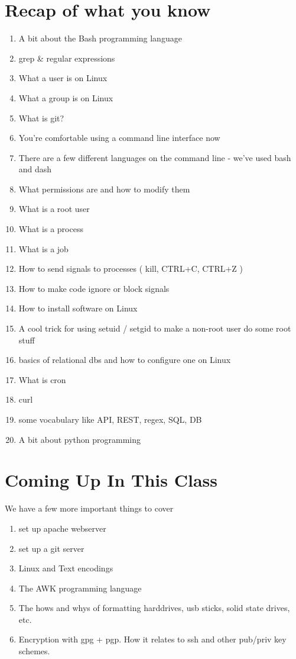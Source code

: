 \documentclass[12pt]{article}
\begin{document}
\section{Recap of what you know}
\begin{enumerate}
\item A bit about the Bash programming language
\item grep \& regular expressions
\item What a user is on Linux
\item What a group is on Linux
\item What is git?
\item You're comfortable using a command line interface now
\item There are a few different languages on the command line - we've used bash and dash
\item What permissions are and how to modify them
\item What is a root user
\item What is a process
\item What is a job
\item How to send signals to processes ( kill, CTRL+C, CTRL+Z )
\item How to make code ignore or block signals
\item How to install software on Linux
\item A cool trick for using setuid / setgid to make a non-root user do some root stuff
\item basics of relational dbs and how to configure one on Linux
\item What is cron
\item curl
\item some vocabulary like API, REST, regex, SQL, DB
\item A bit about python programming
\end{enumerate}

\section{Coming Up In This Class}

We have a few more important things to cover
\begin{enumerate}
\xxd
\item set up apache webserver
\item set up a git server
\item Linux and Text encodings
\item The AWK programming language
\item The hows and whys of formatting harddrives, usb sticks, solid state drives, etc.
\item Encryption with gpg + pgp. How it relates to ssh and other pub/priv key schemes.
\end{enumerate}
\end{document}
